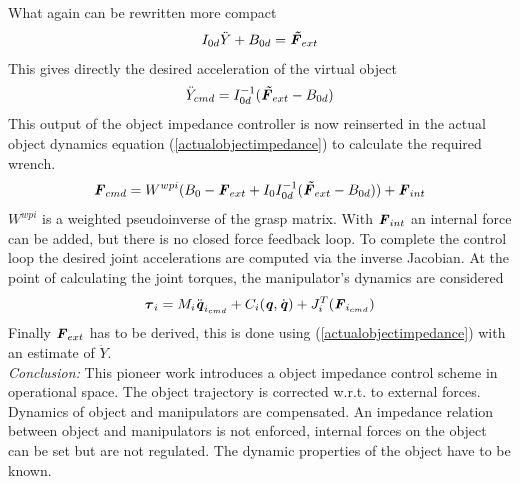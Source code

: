 \documentclass[conference]{IEEEtran}
\begin{document}
What again can be rewritten more compact
\begin{equation}
I_{0d}\ddot{Y}+B_{0d} = \textbf{\textit{\~{F}}}_{ext}
\end{equation}
This gives directly the desired acceleration of the virtual object
\begin{equation}
\ddot{Y}_{cmd} = I_{0d}^{-1}(\textbf{\textit{\~{F}}}_{ext}-B_{0d})
\end{equation}
This output of the object impedance controller is now reinserted in the actual object dynamics equation (\ref{actualobjectimpedance}) to calculate the required wrench.
\begin{equation}
\textbf{\textit{F}}_{cmd} = W^{wpi}(B_0-\textbf{\textit{F}}_{ext}+I_0I_{0d}^{-1}(\textbf{\textit{\~{F}}}_{ext}-B_{0d})) + \textbf{\textit{F}}_{int}
\end{equation}
$ W^{wpi} $ is a weighted pseudoinverse of the grasp matrix. With $ \textbf{\textit{F}}_{int} $ an internal force can be added, but there is no closed force feedback loop.
To complete the control loop the desired joint accelerations are computed via the inverse Jacobian. At the point of calculating the joint torques, the manipulator's dynamics are considered
\begin{equation}
\boldsymbol{\tau}_i = M_i\ddot{\textbf{\textit{q}}}_{i_{cmd}} + C_i(\textbf{\textit{q}},\dot{\textbf{\textit{q}}}) + J_i^T(\textbf{\textit{F}}_{i_{cmd}})
\end{equation}
Finally $ \textbf{\textit{F}}_{ext} $ has to be derived, this is done using (\ref{actualobjectimpedance}) with an estimate of $ \ddot{Y} $.
\\
\emph{Conclusion: }This pioneer work introduces a object impedance control scheme in operational space. The object trajectory is corrected w.r.t. to external forces. Dynamics of object and manipulators are compensated. An impedance relation between object and manipulators is not enforced, internal forces on the object can be set but are not regulated. The dynamic properties of the object have to be known.

\end{document}
